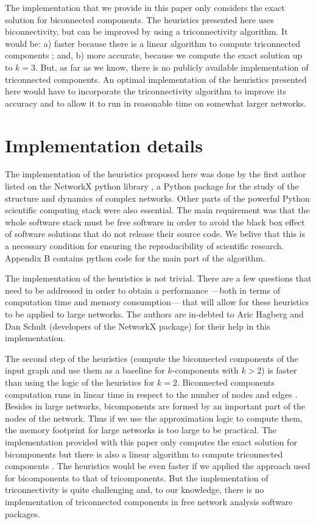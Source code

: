 The implementation that we provide in this paper only considers the exact solution for biconnected components. The heuristics presented here uses biconnectivity, but can be improved by using a triconnectivity algorithm. It would be: a) faster because there is a linear algorithm to compute triconnected components \citep{tarjan:1974,gutwenger:2001}; and, b) more accurate, because we compute the exact solution up to $k=3$. But, as far as we know, there is no publicly available implementation of triconnected components. An optimal implementation of the heuristics presented here would have to incorporate the triconnectivity algorithm to improve its accuracy and to allow it to run in reasonable time on somewhat larger networks.

\newpage

\section{Implementation details}
\label{implementation}

The implementation of the heuristics proposed here was done by the first author listed on the NetworkX python library \citep{hagberg:2008}, a Python package for the study of the structure and dynamics of complex networks. Other parts of the powerful Python \citep{vanrossum:1995} scientific computing stack \citep{scipy,ipython, hunter:2007} were also essential. The main requirement was that the whole software stack must be free software in order to avoid the black box effect of software solutions that do not release their source code. We belive that this is a necessary condition for ensuring the reproducibility of scientific research. Appendix B contains python code for the main part of the algorithm. 

The implementation of the heuristics is not trivial. There are a few questions that need to be addressed in order to obtain a performance ---both in terms of computation time and memory consumption--- that will allow for these heuristics to be applied to large networks. The authors are in-debted to Aric Hagberg and Dan Schult (developers of the NetworkX package) for their help in this implementation.

The second step of the heuristics (compute the biconnected components of the input graph and use them as a baseline for $k$-components with $k > 2$) is faster than using the logic of the heuristics for $k=2$. Biconnected components computation runs in linear time in respect to the number of nodes and edges \citep{tarjan:1972}. Besides in large networks, bicomponents are formed by an important part of the nodes of the network. Thus if we use the approximation logic to compute them, the memory footprint for large networks is too large to be practical. The implementation provided with this paper only computes the exact solution for bicomponents but there is also a linear algorithm to compute triconnected components \citep{tarjan:1974,gutwenger:2001}. The heuristics would be even faster if we applied the approach used for bicomponents to that of tricomponents. But the implementation of triconnectivity is quite challenging and, to our knowledge, there is no implementation of triconnected components in free network analysis software packages.

